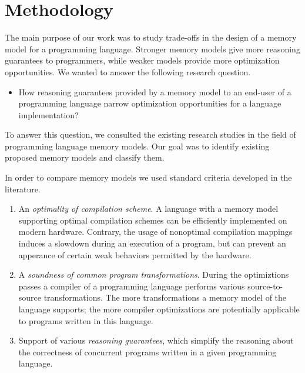 \section{Methodology}
\label{sec:methodology}

The main purpose of our work was to study 
trade-offs in the design of a memory model 
for a programming language.
Stronger memory models give more reasoning guarantees to programmers, 
while weaker models provide more optimization opportunities. 
We wanted to answer the following research question.

\begin{itemize}
  \item How reasoning guarantees provided by a memory model 
    to an end-user of a programming language narrow  
    optimization opportunities for a language implementation?
\end{itemize}

To answer this question, we consulted the existing research studies 
in the field of programming language memory models.
Our goal was to identify existing proposed memory models and classify them.

In order to compare memory models we used standard criteria developed in the literature.

\begin{enumerate}[label=\textbf{C.\arabic*}]
  
  \item \label{item:criteria:opt-comp}
    An \emph{optimality of compilation scheme}. 
    A language with a memory model supporting 
    optimal compilation schemes can be efficiently 
    implemented on modern hardware. 
    Contrary, the usage of nonoptimal compilation mappings
    induces a slowdown during an execution of a program, 
    but can prevent an apperance of certain weak behaviors
    permitted by the hardware.   

  \item \label{item:criteria:sound-trans}
    A \emph{soundness of common program transformations}. 
    During the optimiztions passes a compiler of a programming language
    performs various source-to-source transformations.
    The more transformations a memory model of the language supports;
    the more compiler optimizations are potentially applicable 
    to programs written in this language.

  \item \label{item:criteria:reasoning}
    Support of various \emph{reasoning guarantees}, which simplify 
    the reasoning about the correctness of concurrent programs
    written in a given programming language. 
  
\end{enumerate}


